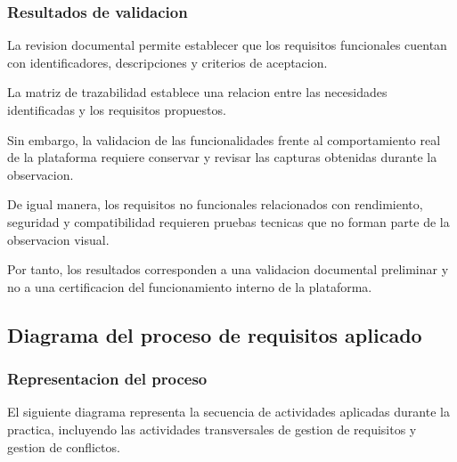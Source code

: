 \documentclass[12pt,a4paper]{article}
\begin{document}
\subsubsection{Resultados de validacion}

La revision documental permite establecer que
los requisitos funcionales cuentan con identificadores,
descripciones y criterios de aceptacion.

La matriz de trazabilidad establece una relacion
entre las necesidades identificadas y los requisitos
propuestos.

Sin embargo, la validacion de las funcionalidades
frente al comportamiento real de la plataforma
requiere conservar y revisar las capturas obtenidas
durante la observacion.

De igual manera, los requisitos no funcionales
relacionados con rendimiento, seguridad y
compatibilidad requieren pruebas tecnicas
que no forman parte de la observacion visual.

Por tanto, los resultados corresponden a una
validacion documental preliminar y no a una
certificacion del funcionamiento interno
de la plataforma.

\subsection{Diagrama del proceso de requisitos aplicado}

\subsubsection{Representacion del proceso}

El siguiente diagrama representa la secuencia
de actividades aplicadas durante la practica,
incluyendo las actividades transversales de
gestion de requisitos y gestion de conflictos.
\end{document}
